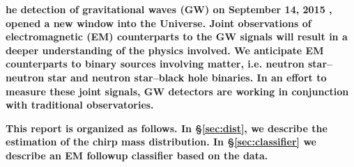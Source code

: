  {\bf he detection of gravitational waves (GW) on September 14, 2015 \parencite{2016PhRvL.116f1102A}, opened a new window into the Universe. Joint observations of electromagnetic (EM) counterparts to the GW signals will result in a deeper understanding of the physics involved. We anticipate EM counterparts to binary sources involving matter, i.e. neutron star--neutron star and neutron star--black hole binaries. In an effort to measure these joint signals, GW detectors are working in conjunction with traditional observatories.}

{\bf This report is organized as follows. In \S\ref{sec:dist}, we describe the estimation of the chirp mass distribution. In \S\ref{sec:classifier} we describe an EM followup classifier based on the data.
}